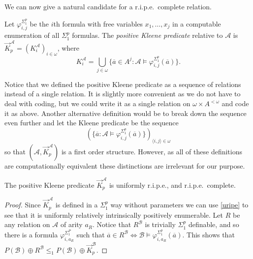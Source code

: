 \documentclass[11pt]{amsart}
\newcommand{\A}{{\mathcal{A}}}
\newcommand{\B}{{\mathcal{B}}}
\newcommand{\N}{\omega}
\renewcommand{\bar}[1]{\overline{#1}}
\renewcommand{\phi}{\varphi}
\begin{document}
We can now give a natural candidate for a r.i.p.e.\ complete relation.
\begin{defn}
    Let $\phi_{i,j}^{\Sigma^p_1}$ be the $i${th} formula with free variables $x_1,\dots, x_j$ in a computable enumeration of all $\Sigma^p_1$ formulas.
    The \emph{positive Kleene predicate} relative to $\A$ is $\vec K^\A_p = \left(K^\A_{i}\right)_{i\in\omega}$, where
    \begin{equation*}
      K^{\A}_{i} = \bigcup_{j\in\omega}\{ \bar a \in A^{j} : \A \models \varphi^{\Sigma_1^p}_{i,j}(\bar a)\}.
    \end{equation*}
\end{defn}
Notice that we defined the positive Kleene predicate as a sequence of relations instead of a single relation. It is slightly more convenient as we do not have to deal with coding, but we could write it as a single relation on $\omega \times A^{<\omega}$ and code it as above. Another alternative definition would be to break down the sequence even further and let the Kleene predicate be the sequence 
\[ (\{\overline a: \A\models \phi_{i,j}^{\Sigma_1^p}(\overline a)\})_{\langle i,j\rangle\in\omega}\]
so that $(\A,\vec K_p^\A)$ is a first order structure. However, as all of these definitions are computationally equivalent these distinctions are irrelevant for our purpose.


\begin{proposition} The positive Kleene predicate $\vec K_p^\A$ is uniformly r.i.p.e., and r.i.p.e.\ complete.
\end{proposition}
\begin{proof}
    Since $\vec K^\A_p$ is defined in a $\Sigma_1^p$ way without parameters we
    can use \cref{uripe} to see that it is uniformly relatively intrinsically positively enumerable. Let $R$ be any relation on $\A$ of arity $a_R$. Notice that $R^\B$ is trivially $\Sigma_1^p$ definable, and so there is a formula $\varphi_{i,a_R}^{\Sigma_1^P}$ such that $\bar a \in R^\B \Leftrightarrow \B \models \varphi_{i,a_R}^{\Sigma_1^p}(\bar a)$. This shows that $P(\B) \oplus R^\B \leq_1 P(\B) \oplus \vec K_p^\B$.
\end{proof}
\end{document}
